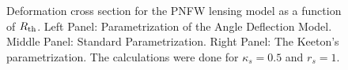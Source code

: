 \begin{figure}[!ht]
{}
\caption{\label{dcs_siep_rth} Deformation cross section for the  PNFW lensing
model as a function of $R_{\rm th}$. Left Panel:
Parametrization of the Angle Deflection Model. Middle Panel: Standard
Parametrization. Right Panel: The Keeton's parametrization. The calculations
were done for $\kappa_s=0.5$ and $r_s=1$.}
\end{figure}
